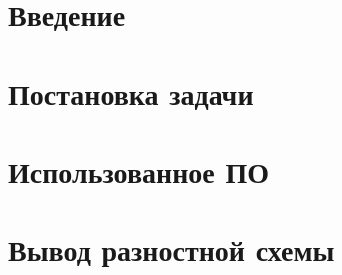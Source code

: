 \documentclass[a4paper, 12pt]{article}
\begin{document}
  \renewcommand*{\vec}[1]{\mathbf{#1}}
  \newcommand{\Int}[2]{\int\limits_{#1}^{#2}}
  \newcommand{\Inner}[1]{\! #1 \,}
  \newcommand{\Dd}[1]{\dd #1}
  \newcommand{\Ddd}[2]{\dd #1 \dd #2}
  \newcommand{\MyVert}[1]{\Big\vert_{#1}}
  \newcommand{\MyVvert}[2]{\Big\vert_{\begin{subarray}{l} #1 \\ #2 \end{subarray}}}

  \newcommand{\Ttitle}[1]{\noindent\textbf{#1}}

  

  
  \setcounter{page}{2}
  \tableofcontents

  \newpage
  \section*{Введение}\label{introduction}
  

  \newpage
  \section{Постановка задачи}
  

  \newpage
  \section{Использованное ПО}
  

  \newpage
  \section{Вывод разностной схемы}
  



\end{document}
